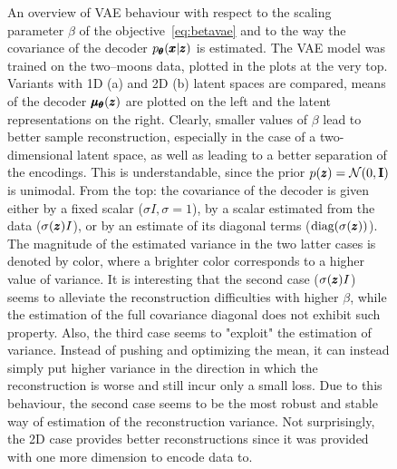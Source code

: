 \begin{figure}
\caption{An overview of VAE behaviour with respect to the scaling parameter $\beta$ of the objective~\eqref{eq:betavae} and to the way the covariance of the decoder $p_{\pmb{{\theta}}}(\pmb{{x}}|\pmb{{z}})$ is estimated. The VAE model was trained on the two--moons data, plotted in the plots at the very top. Variants with 1D (a) and 2D (b) latent spaces are compared, means of the decoder $\pmb{{\mu}}_{\pmb{{\theta}}}(\pmb{{z}})$ are plotted on the left and the latent representations on the right. Clearly, smaller values of $\beta$ lead to better sample reconstruction, especially in the case of a two-dimensional latent space, as well as leading to a better separation of the encodings. This is understandable, since the prior $p(\pmb{{z}})=\mathcal{N}(0,\textbf{I})$ is unimodal. From the top: the covariance of the decoder is given either by a fixed scalar ($\sigma I,\sigma=1$), by a scalar estimated from the data ($\sigma(\pmb{{z}})I$), or by an estimate of its diagonal terms ($\text{diag}(\sigma(\pmb{{z}}))$). The magnitude of the estimated variance in the two latter cases is denoted by color, where a brighter color corresponds to a higher value of variance. It is interesting that the second case ($\sigma(\pmb{{z}})I$) seems to alleviate the reconstruction difficulties with higher $\beta$, while the estimation of the full covariance diagonal does not exhibit such property. Also, the third case seems to "exploit" the estimation of variance. Instead of pushing and optimizing the mean, it can instead simply put higher variance in the direction in which the reconstruction is worse and still incur only a small loss. Due to this behaviour, the second case seems to be the most robust and stable way of estimation of the reconstruction variance. Not surprisingly, the 2D case provides better reconstructions since it was provided with one more dimension to encode data to.}
\label{fig:betavae}
\end{figure}

